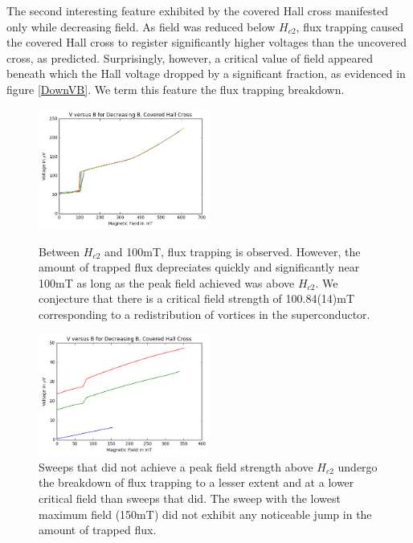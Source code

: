 \documentclass[twocolumn,aps,prl]{revtex4-1} %
\begin{document}
The second interesting feature exhibited by the covered Hall cross manifested only while decreasing field. As field was reduced below $H_{c2}$, flux trapping caused the covered Hall cross to register significantly higher voltages than the uncovered cross, as predicted. Surprisingly, however, a critical value of field appeared beneath which the Hall voltage dropped by a significant fraction, as evidenced in figure \ref{DownVB}. We term this feature the flux trapping breakdown.

\begin{figure}
\includegraphics[width=0.5\textwidth]{DownFullVB.png}
\caption{Between $H_{c2}$ and 100mT, flux trapping is observed. However, the amount of trapped flux depreciates quickly and significantly near 100mT as long as the peak field achieved was above $H_{c2}$. We conjecture that there is a critical field strength of 100.84(14)mT corresponding to a redistribution of vortices in the superconductor.}
\label{DownVB}

\includegraphics[width=0.5\textwidth]{DownPartVB.png}
\caption{Sweeps that did not achieve a peak field strength above $H_{c2}$ undergo the breakdown of flux trapping to a lesser extent and at a lower critical field than sweeps that did. The sweep with the lowest maximum field (150mT) did not exhibit any noticeable jump in the amount of trapped flux.}
\label{DownVB2}
\end{figure}
\end{document}

